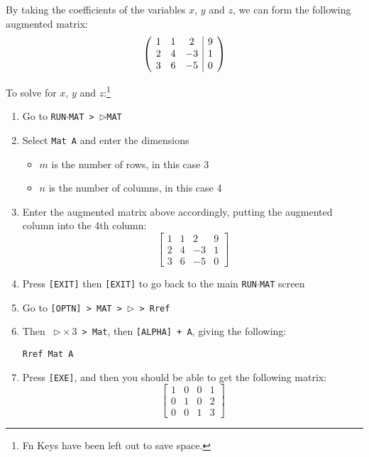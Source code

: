 \documentclass[a5paper,draft]{memoir}
\makeatletter
\newenvironment{amatrix}[1]{%
		\left(\hspace{0.15cm}\begin{array}{@{}*{#1}{c}|c@{}}
		}{%
	\end{array}\hspace{0.15cm}\right)
	}
\def\code#1{\texttt{#1}}
\makeatother
\begin{document}
By taking the coefficients of the variables $x$, $y$ and $z$, we can form the following augmented matrix:
\[
	\begin{amatrix}{3}
		1 & 1 & 2  & 9 \\  
		2 & 4 & -3 & 1 \\
		3 & 6 & -5 & 0
	\end{amatrix}
\]

To solve for $x$, $y$ and $z$:\footnote{ Fn Keys have been left out to save space.}
\begin{enumerate}
	\item Go to \code{RUN$\cdot$MAT > $\triangleright$MAT}
	\item Select \code{Mat A} and enter the dimensions
	\begin{itemize}
		\item $m$ is the number of rows, in this case 3
		\item $n$ is the number of columns, in this case 4
	\end{itemize}
	\item Enter the augmented matrix above accordingly, putting the augmented column into the 4th column:
	\begin{equation*}
		\left[
			\begin{array}{cccc}
			1 & 1 & 2  & 9 \\  
			2 & 4 & -3 & 1 \\
			3 & 6 & -5 & 0
			\end{array}
		\right]
	\end{equation*}
	\item Press \code{[EXIT]} then \code{[EXIT]} to go back to the main \code{RUN$\cdot$MAT} screen
	\item Go to \code{[OPTN] > MAT > $\triangleright$ > Rref}
	\item Then \code{ $\triangleright \times 3$ > Mat}, then \code{[ALPHA] + A}, giving the following:
	\begin{center}
		\code{Rref Mat A}
	\end{center}
	\item Press \code{[EXE]}, and then you should be able to get the following matrix:
	\begin{equation*}
		\left[
			\begin{array}{cccc}
			1 & 0 & 0 & 1 \\  
			0 & 1 & 0 & 2 \\
			0 & 0 & 1 & 3
			\end{array}
		\right]
	\end{equation*}
\end{enumerate}
\end{document}
